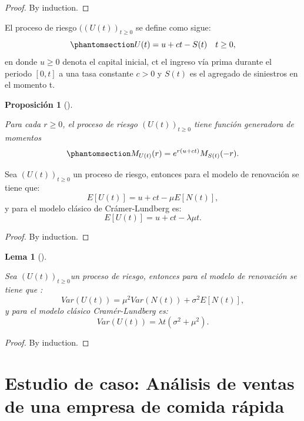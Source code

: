 \documentclass[
  us-letterpaper,
]{scrreprt}
\theoremstyle{plain}
\newtheorem{lemma}{Lema}[chapter]
\theoremstyle{plain}
\newtheorem{proposition}{Proposición}[chapter]
\theoremstyle{definition}
\theoremstyle{remark}
\begin{document}
\begin{proof}
By induction.
\end{proof}

El proceso de riesgo \(((U(t))_{t \geq 0}\) se define como sigue:
\begin{equation}\phantomsection\label{eq-1.7}{U(t) = u + ct - S(t) \ \ \ t\geq 0, }\end{equation}
en donde \(u \geq 0\) denota el capital inicial, ct el ingreso vía prima
durante el periodo \([0,t]\) a una tasa constante \(c > 0\) y \(S(t)\)
es el agregado de siniestros en el momento t.

\begin{proposition}[]\protect\hypertarget{prp-1}{}\label{prp-1}

Para cada \(r\geq0\), el proceso de riesgo \((U(t))_{t\geq0}\) tiene
función generadora de momentos
\begin{equation}\phantomsection\label{eq-1.8}{M_{U(t)}(r) =e^{r(u + ct)} M_{S(t)}(-r).}\end{equation}

\end{proposition}

Sea \((U(t))_{t\geq0}\) un proceso de riesgo, entonces para el modelo de
renovación se tiene que: \[E[U(t)] = u + ct - \mu E[N(t)],\] y para el
modelo clásico de Crámer-Lundberg es:
\[E[U(t)] = u + ct - \lambda \mu t.\]

\begin{proof}
By induction.
\end{proof}

\begin{lemma}[]\protect\hypertarget{lem-4}{}\label{lem-4}

Sea \((U(t))_{t\geq0}\)un proceso de riesgo, entonces para el modelo de
renovación se tiene que :
\[ Var(U(t)) = \mu^2 Var(N(t)) + \sigma^2 E[N(t)],\] y para el modelo
clásico Cramér-Lundberg es: \[Var(U(t)) = \lambda t(\sigma^2 + \mu^2).\]

\end{lemma}

\begin{proof}
By induction.
\end{proof}


\chapter{Estudio de caso: Análisis de ventas de una empresa de comida
rápida}\label{estudio-de-caso-anuxe1lisis-de-ventas-de-una-empresa-de-comida-ruxe1pida}
\end{document}
